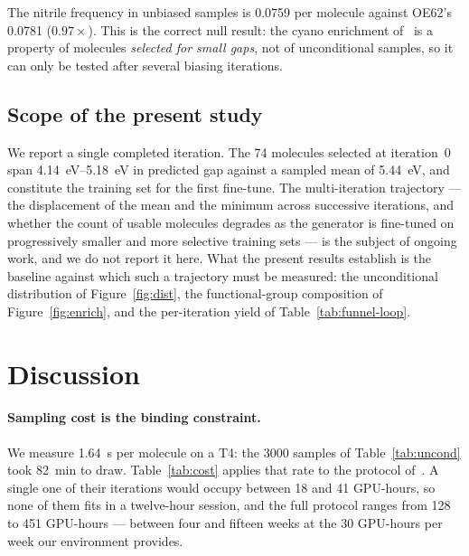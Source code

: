 \documentclass[runningheads]{llncs}
\begin{document}
The nitrile frequency in unbiased samples is
\num{0.0759} per molecule against OE62's \num{0.0781}
($0.97\times$). This is the correct null result: the cyano enrichment
of~\cite{westermayr2022} is a property of molecules \emph{selected for
small gaps}, not of unconditional samples, so it can only be tested
after several biasing iterations.

\subsection{Scope of the present study}

We report a single completed iteration. The \num{74} molecules selected
at iteration~0 span \SIrange{4.14}{5.18}{\electronvolt} in predicted
gap against a sampled mean of \SI{5.44}{\electronvolt}, and constitute
the training set for the first fine-tune. The multi-iteration
trajectory --- the displacement of the mean and the minimum across
successive iterations, and whether the count of usable molecules
degrades as the generator is fine-tuned on progressively smaller and
more selective training sets --- is the subject of ongoing work, and
we do not report it here. What the present results establish is the
baseline against which such a trajectory must be measured: the
unconditional distribution of Figure~\ref{fig:dist}, the
functional-group composition of Figure~\ref{fig:enrich}, and the
per-iteration yield of Table~\ref{tab:funnel-loop}.

\section{Discussion}
\label{sec:discussion}

\paragraph{Sampling cost is the binding constraint.} We measure
\SI{1.64}{\second} per molecule on a T4: the \num{3000} samples of
Table~\ref{tab:uncond} took \SI{82}{\minute} to draw.
Table~\ref{tab:cost} applies that rate to the protocol
of~\cite{westermayr2022}. A single one of their iterations would occupy
between \num{18} and \num{41} GPU-hours, so none of them fits in a
twelve-hour session, and the full protocol ranges from \num{128} to
\num{451} GPU-hours --- between four and fifteen weeks at the
\num{30} GPU-hours per week our environment provides.
\end{document}
